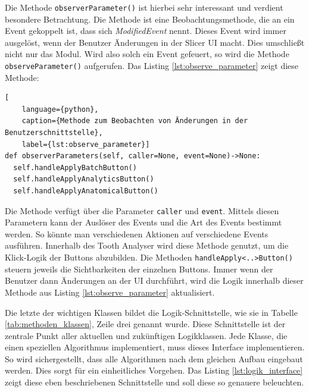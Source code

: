 Die Methode \texttt{observerParameter()} ist hierbei sehr interessant und
verdient besondere Betrachtung. Die Methode ist eine Beobachtungsmethode, die an
ein Event gekoppelt ist, dass sich \textit{ModifiedEvent} nennt. Dieses Event wird
immer ausgelöst, wenn der Benutzer Änderungen in der Slicer \ac{UI} macht. Dies
umschließt nicht nur das Modul. Wird also solch ein Event gefeuert, so wird die
Methode \texttt{observeParameter()} aufgerufen. Das Listing
\ref{lst:observe_parameter} zeigt diese Methode:

\begin{lstlisting}[
    language={python},
    caption={Methode zum Beobachten von Änderungen in der Benutzerschnittstelle},
    label={lst:observe_parameter}]
def observerParameters(self, caller=None, event=None)->None:
  self.handleApplyBatchButton()
  self.handleApplyAnalyticsButton()
  self.handleApplyAnatomicalButton()
\end{lstlisting}

Die Methode verfügt über die Parameter \texttt{caller} und \texttt{event}.
Mittels diesen Parametern kann der Auslöser des Events und die Art des Events
bestimmt werden. So könnte man verschiedenen Aktionen auf verschiedene Events ausführen.
Innerhalb des Tooth Analyser wird diese Methode genutzt, um die Klick-Logik der Buttons
abzubilden. Die Methoden \texttt{handleApply<..>Button()} steuern jeweils die Sichtbarkeiten
der einzelnen Buttons. Immer wenn der Benutzer dann Änderungen an der \ac{UI} durchführt,
wird die Logik innerhalb dieser Methode aus Listing \ref{lst:observe_parameter}
aktualisiert.

Die letzte der wichtigen Klassen bildet die Logik-Schnittstelle, wie sie in Tabelle
\ref{tab:methoden_klassen}, Zeile drei genannt wurde. Diese Schnittstelle ist der
zentrale Punkt aller aktuellen und zukünftigen Logikklassen. Jede Klasse, die einen
speziellen Algorithmus implementiert, muss dieses Interface implementieren. So wird
sichergestellt, dass alle Algorithmen nach dem gleichen Aufbau eingebaut werden.
Dies sorgt für ein einheitliches Vorgehen. Das Listing \ref{lst:logik_interface}
zeigt diese eben beschriebenen Schnittstelle und soll diese so genauere
beleuchten.

\pagebreak

